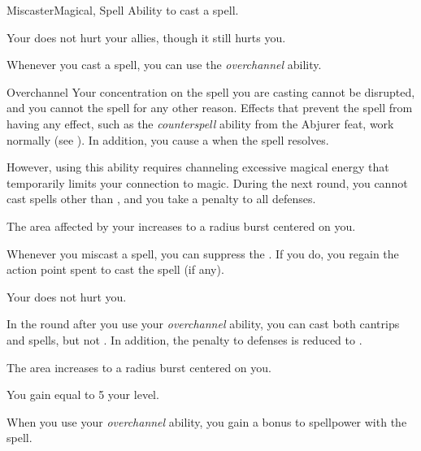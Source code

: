     \begin{feat}{Miscaster}{Magical, Spell}
        \featpre Ability to cast a spell.

         Your  does not hurt your allies, though it still hurts you.

         Whenever you cast a spell, you can use the \textit{overchannel} ability.
        \begin{ability}{Overchannel}
            Your concentration on the spell you are casting cannot be disrupted, and you cannot  the spell for any other reason.
            Effects that prevent the spell from having any effect, such as the \textit{counterspell} ability from the Abjurer feat, work normally (see ).
            In addition, you cause a  when the spell resolves.

            However, using this ability requires channeling excessive magical energy that temporarily limits your connection to magic.
            During the next round, you cannot cast spells other than , and you take a  penalty to all defenses.
        \end{ability}

         The area affected by your  increases to a \areasmall radius burst centered on you.

         Whenever you miscast a spell, you can suppress the .
        If you do, you regain the action point spent to cast the spell (if any).

         Your  does not hurt you.

         In the round after you use your \textit{overchannel} ability, you can cast both cantrips and spells, but not .
        In addition, the penalty to defenses is reduced to .

         The area increases to a \areamed radius burst centered on you.

         You gain  equal to 5 \add your level.

         When you use your \textit{overchannel} ability, you gain a  bonus to spellpower with the spell.
    \end{feat}

